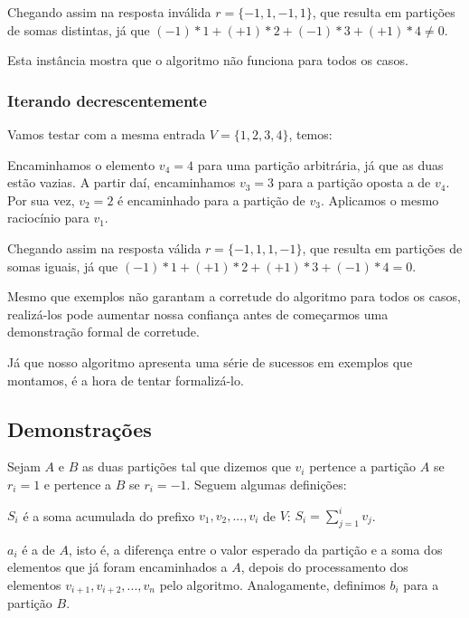 Chegando assim na resposta inválida $r = \{-1, 1, -1, 1\}$, que resulta em partições de somas distintas, já que $(-1)*1 + (+1)*2 + (-1)*3 + (+1)*4 \neq 0$.

Esta instância mostra que o algoritmo não funciona para todos os casos.

\subsubsection*{Iterando decrescentemente}

Vamos testar com a mesma entrada $V = \{1, 2, 3, 4\}$, temos:

Encaminhamos o elemento $v_4 = 4$ para uma partição arbitrária, já que as duas estão vazias. A partir daí, encaminhamos $v_3 = 3$ para a partição oposta a de $v_4$. Por sua vez, $v_2 = 2$ é encaminhado para a partição de $v_3$. Aplicamos o mesmo raciocínio para $v_1$.

Chegando assim na resposta válida $r = \{-1, 1, 1, -1\}$, que resulta em partições de somas iguais, já que $(-1)*1 + (+1)*2 + (+1)*3 + (-1)*4 = 0$.

Mesmo que exemplos não garantam a corretude do algoritmo para todos os casos, realizá-los pode aumentar nossa confiança antes de começarmos uma demonstração formal de corretude.

Já que nosso algoritmo apresenta uma série de sucessos em exemplos que montamos, é a hora de tentar formalizá-lo.

\subsection*{Demonstrações}

Sejam $A$ e $B$ as duas partições tal que dizemos que $v_i$ pertence a partição $A$ se $r_i = 1$ e pertence a $B$ se $r_i = -1$. Seguem algumas definições:

\begin{defi}
$S_i$ é a soma acumulada do prefixo $v_1, v_2, ..., v_i$ de $V$: $S_i = \sum_{j = 1}^{i} v_j$.
\end{defi}

\begin{defi}
$a_i$ é a  de $A$, isto é, a diferença entre o valor esperado da partição e a soma dos elementos que já foram encaminhados a $A$, depois do processamento dos elementos $v_{i + 1}, v_{i + 2}, ..., v_{n}$ pelo algoritmo.
Analogamente, definimos $b_i$ para a partição $B$.
\end{defi}

